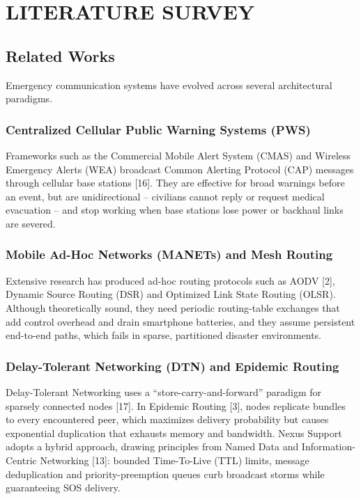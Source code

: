 \documentclass[12pt,a4paper]{report}
\begin{document}
\chapter{LITERATURE SURVEY}

\section{Related Works}
Emergency communication systems have evolved across several architectural paradigms.

\subsection{Centralized Cellular Public Warning Systems (PWS)}
Frameworks such as the Commercial Mobile Alert System (CMAS) and Wireless Emergency Alerts (WEA) broadcast Common Alerting Protocol (CAP) messages through cellular base stations [16]. They are effective for broad warnings before an event, but are unidirectional -- civilians cannot reply or request medical evacuation -- and stop working when base stations lose power or backhaul links are severed.

\subsection{Mobile Ad-Hoc Networks (MANETs) and Mesh Routing}
Extensive research has produced ad-hoc routing protocols such as AODV [2], Dynamic Source Routing (DSR) and Optimized Link State Routing (OLSR). Although theoretically sound, they need periodic routing-table exchanges that add control overhead and drain smartphone batteries, and they assume persistent end-to-end paths, which fails in sparse, partitioned disaster environments.

\subsection{Delay-Tolerant Networking (DTN) and Epidemic Routing}
Delay-Tolerant Networking uses a ``store-carry-and-forward'' paradigm for sparsely connected nodes [17]. In Epidemic Routing [3], nodes replicate bundles to every encountered peer, which maximizes delivery probability but causes exponential duplication that exhausts memory and bandwidth. Nexus Support adopts a hybrid approach, drawing principles from Named Data and Information-Centric Networking [13]: bounded Time-To-Live (TTL) limits, message deduplication and priority-preemption queues curb broadcast storms while guaranteeing SOS delivery.
\end{document}
